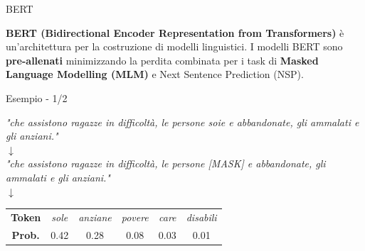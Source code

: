 \documentclass{beamer}
\begin{document}
\begin{frame}{BERT}
	
\textbf{BERT (Bidirectional Encoder Representation from Transformers)} è un'architettura per la costruzione di modelli linguistici.
\newline \newline
I modelli BERT sono \textbf{pre-allenati} minimizzando la perdita combinata per i task di \textbf{Masked Language Modelling (MLM)} e Next Sentence Prediction (NSP).
	
\end{frame}



\begin{frame}{Esempio - 1/2}

\begin{center}
\textit{"che assistono ragazze in difficoltà, le persone {\color{rossoPantano} soie} e abbandonate, gli ammalati e gli anziani."}\\
$\downarrow$\\
\textit{"che assistono ragazze in difficoltà, le persone {\color{rossoPantano}[MASK]}  e abbandonate, gli ammalati e gli anziani."}\\
$\downarrow$\\
\begin{tabular}{c|ccccc}
\textbf{Token} & \textit{sole} & \textit{anziane} & \textit{povere} & \textit{care} & \textit{disabili}\\
\textbf{Prob.} & 0.42 & 0.28 & 0.08 & 0.03 & 0.01 \\
\end{tabular}
\end{center}
\end{frame}
\end{document}
